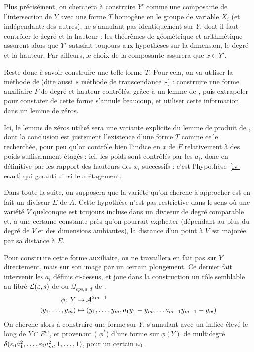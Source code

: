 \documentclass{mpg-preth}
\begin{document}
Plus précisément, on cherchera à construire $Y'$ comme une composante de
l'intersection de $Y$ avec une forme $T$ homogène en le groupe de variable
$X_i$ (et indépendante des autres), ne s'annulant pas identiquement sur $Y$,
dont il faut contrôler le degré et la hauteur : les théorèmes de 
géométrique et arithmétique assurent alors que $Y'$ satisfait toujours aux
hypothèses sur la dimension, le degré et la hauteur. Par ailleurs, le choix de
la composante assurera que $x \in Y'$.

Reste donc à savoir construire une telle forme $T$. Pour cela, on va utiliser
la méthode de  (dite aussi « méthode de transcendance ») :
construire une forme auxiliaire $F$ de degré et hauteur contrôlés, grâce à un
lemme de , puis extrapoler pour constater de cette forme s'annule
beaucoup, et utiliser cette information dans un lemme de zéros.

Ici, le lemme de zéros utilisé sera une variante explicite du lemme de produit
de , dont la conclusion est justement l'existence d'une forme
$T$ comme celle recherchée, pour peu qu'on contrôle bien l'indice en $x$ de
$F$ relativement à des poids suffisamment étagés : ici, les poids sont
contrôlés par les $a_i$, donc en définitive par les rapport des hauteurs des
$x_i$ successifs : c'est l'hypothèse~\ref{iv-ecart} qui garanti ainsi leur
étagement.

Dans toute la suite, on supposera que la variété qu'on cherche à approcher est
en fait un diviseur $E$ de $A$. Cette hypothèse n'est pas restrictive dans le
sens où une variété $V$ quelconque est toujours incluse dans un diviseur de
degré comparable et, à une certaine constante près qu'on pourrait expliciter
(dépendant au plus du degré de $V$ et des dimensions ambiantes), la distance
d'un point à $V$ est majorée par sa distance à $E$.

Pour construire cette forme auxiliaire, on ne travaillera en fait pas sur $Y$
directement, mais sur son image par un certain plongement. Ce dernier fait
intervenir les $a_i$ définis ci-dessus, et joue dans la construction un rôle
semblable au fibré $\mathcal L(\varepsilon, s)$ de \cite{faldaav} ou $\mathcal Q_{eps,
  a, d}$ de \cite{remivds}.
\begin{align*}
  \phi \colon Y & \to \mathcal A^{2m-1} \\
  (y_1, \dots, y_m)  & \mapsto
  (y_1, \dots, y_m, a_1 y_1 - y_m, \dots a_{m-1} y_{m-1} - y_m)
\end{align*}
On cherche alors à construire une forme sur $Y$, s'annulant avec un indice
élevé le long de $Y \cap E^m$, et provenant ( $\phi^*$) d'une forme
sur $\phi(Y)$ de multidegré $\delta(\varepsilon_0 a_1^2, \dots, \varepsilon_0 a_m^2, 1,
\dots, 1)$, pour un certain $\varepsilon_0$.
\end{document}
